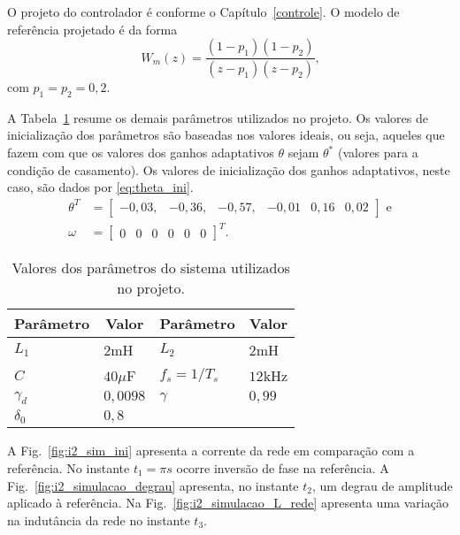   O projeto do controlador é conforme o Capítulo~\ref{controle}. O modelo de referência projetado é da forma
  \begin{equation}
    W_m(z) = \frac{(1-p_1)(1-p_2)}{(z-p_1)(z-p_2)}\text{,}
    \label{eq:wm_simulacao}
  \end{equation}
  com $p_1 = p_2 = 0,2$.

	A Tabela~\ref{tab:parametros_projeto} resume os demais parâmetros utilizados no projeto. Os valores de inicialização dos parâmetros são baseadas nos valores ideais, ou seja, aqueles que fazem com que os valores dos ganhos adaptativos $\theta$ sejam $\theta^*$ (valores para a condição de casamento). Os valores de inicialização dos ganhos adaptativos, neste caso, são dados por \ref{eq:theta_ini}.
  \begin{equation}
    \begin{split}
      \theta^T & = \left[ \begin{matrix} -0,03, & -0,36, & -0,57, & -0,01 & 0,16 & 0,02 \end{matrix} \right]\text{ e}\\
      \omega & = {\left[ \begin{matrix} 0 & 0 & 0 & 0 & 0 & 0 \end{matrix} \right]}^T\text{.}
    \end{split}
    \label{eq:theta_ini}
  \end{equation}

  \begin{table}[htb]
    \renewcommand{\arraystretch}{1.35}
    \setlength{\tabcolsep}{1.2mm}
    \caption{Valores dos parâmetros do sistema utilizados no projeto.}
    \label{tab:parametros_projeto}
    \centering
    \begin{tabular}{l l l l}
      \hline
      \multicolumn{1}{c}{Parâmetro} & \multicolumn{1}{c}{Valor} &
      \multicolumn{1}{c}{Parâmetro} & \multicolumn{1}{c}{Valor} \\
      \hline
      $L_1$      & $2$mH    & $L_2$         & $2$mH  \\
      $C$        & $40\mu$F & $f_s = 1/T_s$ & $12$kHz\\
      $\gamma_d$ & $0,0098$ & $\gamma$      & $0,99$ \\
      $\delta_0$ & $0,8$    &               & \\
      \hline
    \end{tabular}
  \end{table}

  A Fig.~\ref{fig:i2_sim_ini} apresenta a corrente da rede em comparação com a referência. No instante $t_1 = \pi s$ ocorre inversão de fase na referência. A Fig.~\ref{fig:i2_simulacao_degrau} apresenta, no instante $t_2$, um degrau de amplitude aplicado à referência. Na Fig.~\ref{fig:i2_simulacao_L_rede} apresenta uma variação na indutância da rede no instante $t_3$.

